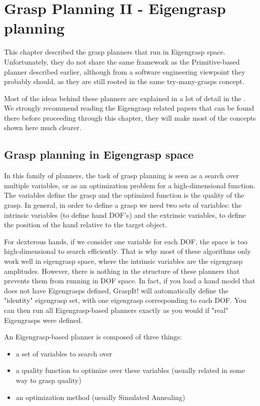 \section{Grasp Planning II - Eigengrasp planning}


This chapter described the grasp planners that run in Eigengrasp
space. Unfortunately, they do not share the same framework as the
Primitive-based planner described earlier, although from a software
engineering viewpoint they probably should, as they are still rooted
in the same try-many-grasps concept.

Most of the ideas behind these planners are explained in a lot of
detail in the . We strongly
recommend reading the Eigengrasp related papers that can be found there
before proceeding through this chapter, they will make most of the
concepts shown here much clearer.

\subsection{Grasp planning in Eigengrasp space}

In this family of planners, the task of grasp planning is seen as a
search over multiple variables, or as an optimization problem for a
high-dimensional function. The variables define the grasp and the
optimized function is the quality of the grasp. In general, in order
to define a grasp we need two sets of variables: the intrinsic
variables (to define hand DOF's) and the extrinsic variables, to
define the position of the hand relative to the target object.

For dexterous hands, if we consider one variable for each DOF, the
space is too high-dimensional to search efficiently. That is why most
of these algorithms only work well in eigengrasp space, where the
intrinsic variables are the eigengrasp amplitudes. However, there is
nothing in the structure of these planners that prevents them from
running in DOF space. In fact, if you load a hand model that does not
have Eigengrasps defined, GraspIt! will automatically define the
"identity" eigengrasp set, with one eigengrasp corresponding to each
DOF. You can then run all Eigengrasp-based planners exactly as you
would if "real" Eigengrasps were defined.

An Eigengrasp-based planner is composed of three things:
\begin{itemize}
\item a set of variables to search over
\item a quality function to optimize over these variables (usually
  related in some way to grasp quality)
\item an optimization method (usually Simulated Annealing)
\end{itemize}

